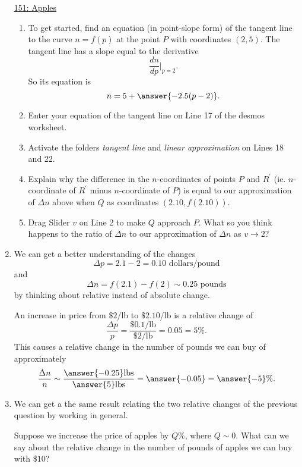 \documentclass{ximera}
\begin{document}
\begin{question}
\begin{enumerate}
\href{https://www.desmos.com/calculator/qw7wislq0c}{151: Apples}

\begin{enumerate}
\item To get started, find an equation (in point-slope form) of the tangent line to the curve $n=f(p)$ at the point $P$ with coordinates $(2,5)$. The tangent line has a slope equal to the derivative 
\[
   \frac{dn}{dp} \Big|_{p=2} .
\]
So its equation is 
\[
      n = 5 + \answer{-2.5(p-2)} .
\]

\item Enter your equation of the tangent line on Line 17 of the desmos worksheet.

\item Activate the folders \emph{tangent line} and \emph{linear approximation} on Lines 18 and 22. 

\item Explain why the difference in the $n$-coordinates of points $P$ and $R^\prime$ (ie. $n$-coordinate of $R^\prime$ minus $n$-coordinate of $P$) is equal to our approximation of $\Delta n$ above when $Q$ as coordinates $(2.10,f(2.10))$.

\item Drag Slider $v$ on Line 2 to make $Q$ approach $P$. What so  you think happens to the ratio of $\Delta n$ to our approximation of $\Delta n$ as $v\to 2$?
\end{enumerate}


\item We can get a better understanding of the changes 
\[
      \Delta p = 2.1 - 2 = 0.10 \text{ dollars/pound}
\]
and 
\[
   \Delta n = f(2.1)-f(2) \sim 0.25 \text { pounds}
\]
by thinking about relative instead of absolute change.

An increase in price from $\$2$/lb to $\$2.10$/lb is a relative change of
\[
    \frac{\Delta p}{p} = \frac{\$0.1/\text{lb}}{\$ 2/\text{lb}} = 0.05 = 5\% .
\]
This causes a relative change in the number of pounds we can buy of approximately
\[
    \frac{\Delta n}{n} \sim \frac{\answer{-0.25} \text{lbs}}{\answer{5}\text{lbs}} = \answer{-0.05} = \answer{-5}\%.
\]
 
\item We can get a the same result relating the two relative changes of the previous question by working in general. 

Suppose we increase the price of apples by $Q\%$, where $Q\sim 0$. What can we say about the relative change in the number of pounds of apples we can buy with $\$10$?


\end{enumerate}
\end{question}
\end{document}
